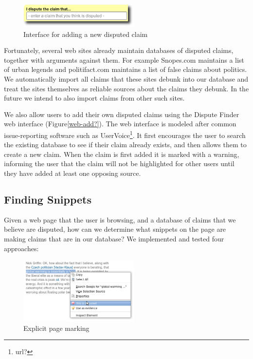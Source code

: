 \documentclass{www2010-submission}
\newcommand{\todo}[1]{}
\begin{document}
\begin{figure}[tb]
	\begin{center}
	\includegraphics[width=6cm]{pictures/add_claim.png}
	\caption{Interface for adding a new disputed claim}
	\label{add_claim}
	\end{center}
\end{figure}


Fortunately, several web sites already maintain databases of disputed claims, together with arguments against them. For example Snopes.com maintains a list of urban legends and politifact.com maintains a list of false claims about politics. We automatically import all claims that these sites debunk into our database and treat the sites themselves as reliable sources about the claims they debunk. In the future we intend to also import claims from other such sites.

We also allow users to add their own disputed claims using the Dispute Finder web interface (Figure\ref{web-add?}). The web interface is modeled after common issue-reporting software such as UserVoice\footnote{url?}. It first encourages the user to search the existing database to see if their claim already exists, and then allows them to create a new claim. When the claim is first added it is marked with a warning, informing the user that the claim will not be highlighted for other users until they have added at least one opposing source.

\todo{Actually import the Politifact data}

\subsection{Finding Snippets}

Given a web page that the user is browsing, and a database of claims that we believe are disputed, how can we determine what snippets on the page are making claims that are in our database? We implemented and tested four approaches:

\begin{figure}[tb]
	\begin{center}
	\includegraphics[width=6cm]{pictures/mark_disputed.png}
	\caption{Explicit page marking}
	\label{mark_disputed}
	\end{center}
\end{figure}
\end{document}
